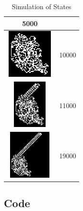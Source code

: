 \begin{table}[!ht]
\begin{center}
\begin{tabular}{ | c | c | }
				5000 \\ \hline
			\includegraphics[width=25mm, height=25mm]{question_4/Iteration-10000.eps} &
				10000 \\ \hline
			\includegraphics[width=25mm, height=25mm]{question_4/Iteration-11000.eps} &
				11000 \\ \hline
			\includegraphics[width=25mm, height=25mm]{question_4/Iteration-19000.eps} &
				19000 \\ \hline
		\end{tabular}
	\end{center}
\caption{Simulation of States}
\end{table}

\clearpage
\subsection{Code}


